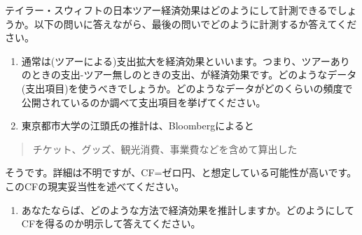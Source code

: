 \documentclass[
  letterpaper,
  DIV=11,
  numbers=noendperiod,
  oneside]{scrartcl}
\providecommand{\tightlist}{%
  \setlength{\itemsep}{0pt}\setlength{\parskip}{0pt}}\usepackage{longtable,booktabs,array}
\begin{document}
テイラー・スウィフトの日本ツアー経済効果はどのようにして計測できるでしょうか。以下の問いに答えながら、最後の問いでどのように計測するか答えてください。

\begin{enumerate}
\def\labelenumi{\arabic{enumi}.}
\tightlist
\item
  通常は(ツアーによる)支出拡大を経済効果といいます。つまり、ツアーありのときの支出-ツアー無しのときの支出、が経済効果です。どのようなデータ(支出項目)を使うべきでしょうか。どのようなデータがどのくらいの頻度で公開されているのか調べて支出項目を挙げてください。
\item
  東京都市大学の江頭氏の推計は、Bloombergによると
\end{enumerate}

\begin{quote}
チケット、グッズ、観光消費、事業費などを含めて算出した
\end{quote}

そうです。詳細は不明ですが、CF=ゼロ円、と想定している可能性が高いです。このCFの現実妥当性を述べてください。

\begin{enumerate}
\def\labelenumi{\arabic{enumi}.}
\setcounter{enumi}{2}
\tightlist
\item
  あなたならば、どのような方法で経済効果を推計しますか。どのようにしてCFを得るのか明示して答えてください。
\end{enumerate}
\end{document}
